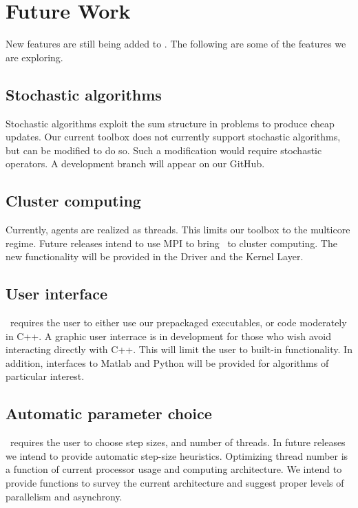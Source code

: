 \section{Future Work}

New features are still being added to \pkg. The following are some of the features we are exploring.

\subsection{Stochastic algorithms}

Stochastic algorithms exploit the sum structure in problems to produce cheap updates. Our current toolbox does not currently support stochastic algorithms, but can be modified to do so. Such a modification would require stochastic operators. A development branch will appear on our GitHub.

\subsection{Cluster computing}

 Currently, agents are realized as threads.
 This limits our toolbox to the multicore regime.
 Future releases intend to use MPI to bring \pkg~to cluster computing. The new functionality will be provided in the Driver and the Kernel Layer.

\subsection{User interface}
 \pkg~requires the user to either use our prepackaged executables, or code moderately in C++.
 A graphic user interrace is in development for those who wish avoid interacting directly with C++.
 This will limit the user to built-in functionality.
 In addition, interfaces to Matlab and Python will be provided for algorithms of particular interest.

\subsection{Automatic parameter choice}
\pkg~requires the user to choose step sizes, and number of threads.
In future releases we intend to provide automatic step-size heuristics.
Optimizing thread number is a function of current processor usage and computing architecture.
We intend to provide functions to survey the current architecture and suggest proper levels of parallelism and asynchrony.

